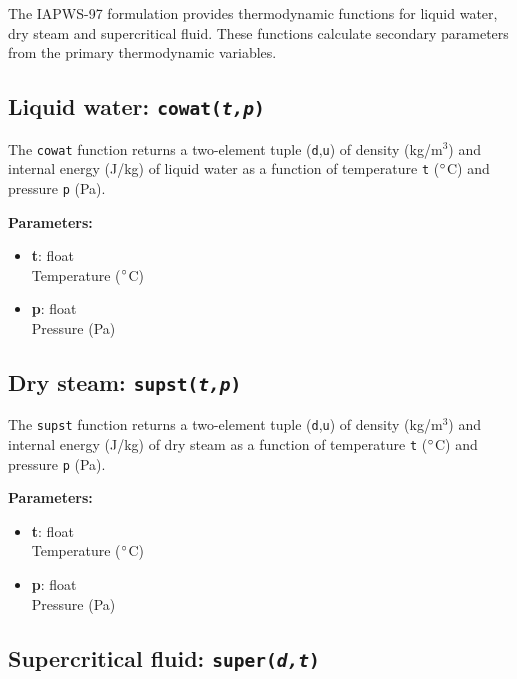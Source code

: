 The IAPWS-97 formulation provides thermodynamic functions for liquid water, dry steam and supercritical fluid.  These functions calculate secondary parameters from the primary thermodynamic variables.

\begin{snugshade}
\subsection{Liquid water: \texttt{cowat(\emph{t,p})}}
\end{snugshade}
\label{sec:iapws97:cowat}

The \texttt{cowat} function returns a two-element tuple (\texttt{d},\texttt{u}) of density (kg/m$^3$) and internal energy (J/kg) of liquid water as a function of temperature \texttt{t} ($\degree$C) and pressure \texttt{p} (Pa).

\textbf{Parameters:}
\begin{itemize}
\item \textbf{t}: float\\
  Temperature ($\degree$C)
\item \textbf{p}: float\\
  Pressure (Pa)
\end{itemize}

\begin{snugshade}
\subsection{Dry steam: \texttt{supst(\emph{t,p})}}
\end{snugshade}
\label{sec:iapws97:supst}

The \texttt{supst} function returns a two-element tuple (\texttt{d},\texttt{u}) of density (kg/m$^3$) and internal energy (J/kg) of dry steam as a function of temperature \texttt{t} ($\degree$C) and pressure \texttt{p} (Pa).

\textbf{Parameters:}
\begin{itemize}
\item \textbf{t}: float\\
  Temperature ($\degree$C)
\item \textbf{p}: float\\
  Pressure (Pa)
\end{itemize}

\begin{snugshade}
\subsection{Supercritical fluid: \texttt{super(\emph{d,t})}}
\end{snugshade}
\label{sec:iapws97:super}

